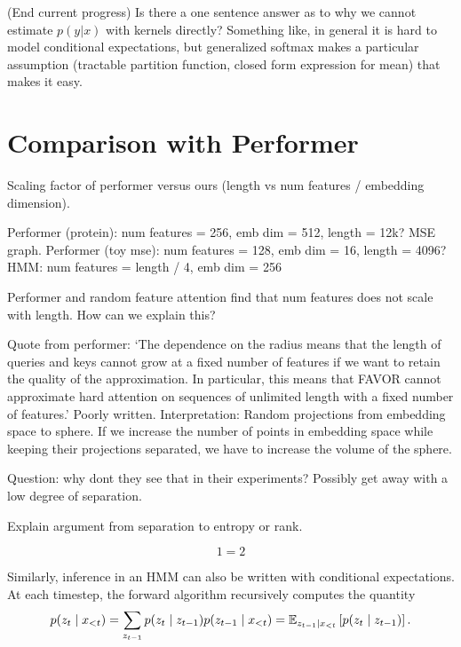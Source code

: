 \documentclass{article}
\begin{document}
(End current progress)
Is there a one sentence answer as to why we cannot estimate $p(y|x)$ with kernels directly?
Something like, in general it is hard to model conditional expectations, but
generalized softmax makes a particular assumption (tractable partition function,
closed form expression for mean) that makes it easy.

\section{Comparison with Performer}
Scaling factor of performer versus ours (length vs num features / embedding dimension).

Performer (protein): num features = 256, emb dim = 512, length = 12k?
MSE graph.
Performer (toy mse): num features = 128, emb dim = 16, length = 4096?
HMM: num features = length / 4, emb dim = 256

Performer and random feature attention find that num features does not scale with
length. How can we explain this?

Quote from performer:
`The dependence on the radius means that the length of queries and keys cannot grow
at a fixed number of features if we want to
retain the quality of the approximation.
In particular, this means that FAVOR cannot approximate
hard attention on sequences of unlimited length with a fixed number of features.'
Poorly written.
Interpretation: Random projections from embedding space to sphere.
If we increase the number of points in embedding space while keeping
their projections separated, we have to increase the volume of the sphere.

Question: why dont they see that in their experiments?
Possibly get away with a low degree of separation.

Explain argument from separation to entropy or rank.

\begin{equation}
1 = 2
\end{equation}

Similarly, inference in an HMM can also be written with conditional expectations.
At each timestep, the forward algorithm recursively computes the quantity
\begin{equation}
\label{eqn:alpha}
p(z_t \mid x_{<t})
= \sum_{z_{t-1}} p(z_t \mid z_{t-1})p(z_{t-1}\mid x_{<t})
= \mathbb{E}_{z_{t-1}\mid x_{<t}}\left[p(z_t \mid z_{t-1})\right].
\end{equation}
\end{document}
